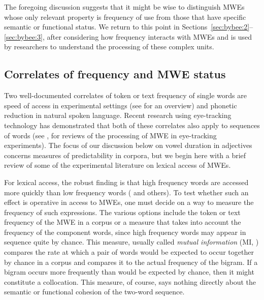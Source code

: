 \documentclass[output=paper]{langscibook}
\begin{document}
The foregoing discussion suggests that it might be wise to distinguish MWEs whose only relevant property is frequency of use from those that have specific semantic or functional status. We return to this point in Sections~\ref{sec:bybee:2}--\ref{sec:bybee:3}, after considering how frequency interacts with MWEs and is used by researchers to understand the processing of these complex units. 

\subsection{Correlates of frequency and MWE status}\label{sec:bybee:1.2}

Two well-documented correlates of token or text frequency of single words are speed of access in experimental settings (see \citealt{Ellis2002} for an overview) and phonetic reduction in natural spoken language. Recent research using eye-tracking technology has demonstrated that both of these correlates also apply to sequences of words (see \citealt{CarrolConklin2014, Vilkaitė2016}, for reviews of the processing of MWE in eye-tracking experiments). The focus of our discussion below on vowel duration in adjectives concerns measures of predictability in corpora, but we begin here with a brief review of some of the experimental literature on lexical access of MWEs.

For lexical access, the robust finding is that high frequency words are accessed more quickly than low frequency words (\citealt{ScarboroughEtAl1977,GardnerEtAl1987} and others). To test whether such an effect is operative in access to MWEs, one must decide on a way to measure the frequency of such expressions. The various options include the token or text frequency of the MWE in a corpus or a measure that takes into account the frequency of the component words, since high frequency words may appear in sequence quite by chance. This measure, usually called \textit{mutual information} (MI, \citealt{ChurchHanks1990}) compares the rate at which a pair of words would be expected to occur together by chance in a corpus and compares it to the actual frequency of the bigram. If a bigram occurs more frequently than would be expected by chance, then it might constitute a collocation. This measure, of course, says nothing directly about the semantic or functional cohesion of the two-word sequence.  
\end{document}
